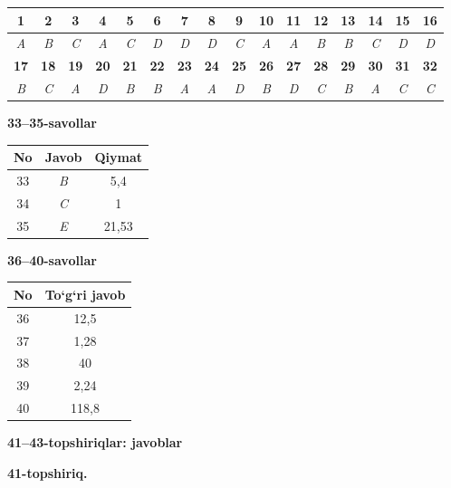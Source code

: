 \documentclass[11pt,a4paper]{article}
\begin{document}
\noindent\begin{tabular}{|c|c|c|c|c|c|c|c|c|c|c|c|c|c|c|c|}\hline
\textbf{1} & \textbf{2} & \textbf{3} & \textbf{4} & \textbf{5} & \textbf{6} & \textbf{7} & \textbf{8} & \textbf{9} & \textbf{10} & \textbf{11} & \textbf{12} & \textbf{13} & \textbf{14} & \textbf{15} & \textbf{16}\\\hline
\textsl{A} & \textsl{B} & \textsl{C} & \textsl{A} & \textsl{C} & \textsl{D} & \textsl{D} & \textsl{D} & \textsl{C} & \textsl{A} & \textsl{A} & \textsl{B} & \textsl{B} & \textsl{C} & \textsl{D} & \textsl{D}\\\hline
\textbf{17} & \textbf{18} & \textbf{19} & \textbf{20} & \textbf{21} & \textbf{22} & \textbf{23} & \textbf{24} & \textbf{25} & \textbf{26} & \textbf{27} & \textbf{28} & \textbf{29} & \textbf{30} & \textbf{31} & \textbf{32}\\\hline
\textsl{B} & \textsl{C} & \textsl{A} & \textsl{D} & \textsl{B} & \textsl{B} & \textsl{A} & \textsl{A} & \textsl{D} & \textsl{B} & \textsl{D} & \textsl{C} & \textsl{B} & \textsl{A} & \textsl{C} & \textsl{C}\\\hline
\end{tabular}\par\medskip
\noindent\textbf{33--35-savollar}\par\smallskip
\noindent\begin{tabular}{|c|c|c|}\hline \textbf{No} & \textbf{Javob} & \textbf{Qiymat}\\\hline
33 & \textsl{B} & 5,4\\\hline
34 & \textsl{C} & 1\\\hline
35 & \textsl{E} & 21,53\\\hline
\end{tabular}\par\medskip
\noindent\textbf{36--40-savollar}\par\smallskip
\noindent\begin{tabular}{|c|c|}\hline \textbf{No} & \textbf{To`g`ri javob}\\\hline
36 & 12,5\\\hline
37 & 1,28\\\hline
38 & 40\\\hline
39 & 2,24\\\hline
40 & 118,8\\\hline
\end{tabular}\par\medskip
\noindent\textbf{41--43-topshiriqlar: javoblar}\par\smallskip
\noindent\textbf{41-topshiriq.}\par
\end{document}
